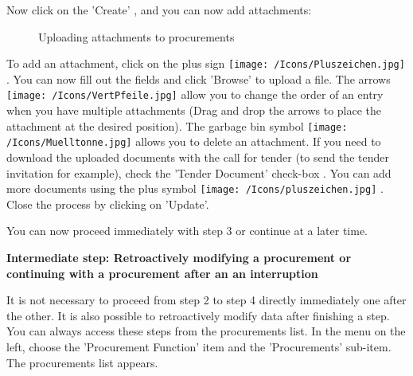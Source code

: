 \vspace{\baselineskip}

Now click on the 'Create' , and you can now add
attachments:

\begin{figure}[H]
\caption{Uploading attachments to procurements}
\end{figure}

To add an attachment, click on the plus sign \texttt{[image: /Icons/Pluszeichen.jpg]} . You can now fill out the fields  and click 'Browse'  to upload a file. The arrows \texttt{[image: /Icons/VertPfeile.jpg]}  allow you to change the order of an entry when you have multiple attachments (Drag and drop the arrows to place the attachment at the desired position). The garbage bin symbol \texttt{[image: /Icons/Muelltonne.jpg]}  allows you to delete an attachment.
If you need to download the uploaded documents with the call for tender (to send the tender invitation for example), check the 'Tender Document' check-box . You can add more documents using the plus symbol \texttt{[image: /Icons/pluszeichen.jpg]} . Close the process by clicking on 'Update'.

\vspace{\baselineskip}

You can now proceed immediately with step 3 or continue at a later time.

\vspace{\baselineskip}

\textbf{Intermediate step: Retroactively modifying a procurement or continuing with a procurement after an
an interruption}

\vspace{\baselineskip}

It is not necessary to proceed from step 2 to step 4 directly immediately one after the other. It is also possible to retroactively modify data after finishing a step. You can always access these steps from the procurements list. In the menu on the left, choose the 'Procurement Function' item and the 'Procurements' sub-item. The procurements list appears.

